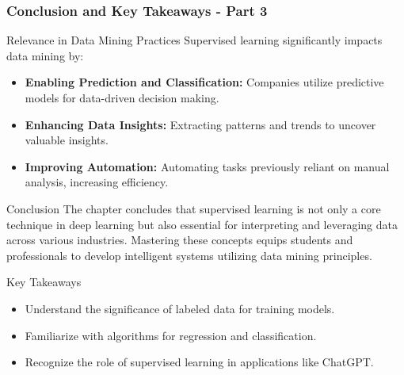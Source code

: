 \documentclass[aspectratio=169]{beamer}
\begin{document}
\begin{frame}[fragile]
    \frametitle{Conclusion and Key Takeaways - Part 3}

    \begin{block}{Relevance in Data Mining Practices}
        Supervised learning significantly impacts data mining by:
        \begin{itemize}
            \item \textbf{Enabling Prediction and Classification:} Companies utilize predictive models for data-driven decision making.
            \item \textbf{Enhancing Data Insights:} Extracting patterns and trends to uncover valuable insights.
            \item \textbf{Improving Automation:} Automating tasks previously reliant on manual analysis, increasing efficiency.
        \end{itemize}
    \end{block}

    \begin{block}{Conclusion}
        The chapter concludes that supervised learning is not only a core technique in deep learning but also essential for interpreting and leveraging data across various industries. Mastering these concepts equips students and professionals to develop intelligent systems utilizing data mining principles.
    \end{block}

    \begin{block}{Key Takeaways}
        \begin{itemize}
            \item Understand the significance of labeled data for training models.
            \item Familiarize with algorithms for regression and classification.
            \item Recognize the role of supervised learning in applications like ChatGPT.
        \end{itemize}
    \end{block}
\end{frame}
\end{document}

